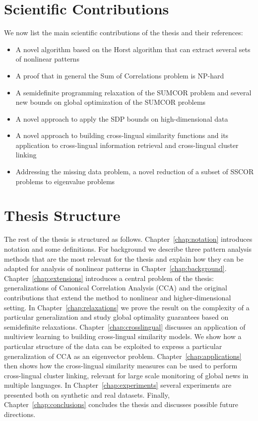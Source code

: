 \section{Scientific Contributions}

We now list the main scientific contributions of the thesis and their references:
\begin{itemize}
\item A novel algorithm based on the Horst algorithm that can extract several sets of nonlinear patterns ~\cite{DBLP:journals/corr/abs-1302-0974}
\item A proof that in general the Sum of Correlations problem is NP-hard ~\cite{DBLP:journals/corr/abs-1302-0974}
\item A semidefinite programming relaxation of the SUMCOR problem and
several new bounds on global optimization of the SUMCOR problems~\cite{DBLP:journals/corr/abs-1302-0974}
\item A novel approach to apply the SDP bounds on high-dimensional data~\cite{DBLP:journals/corr/abs-1302-0974}
\item A novel approach to building cross-lingual similarity functions and its application to cross-lingual information retrieval and cross-lingual cluster linking~\cite{rupnikJAIR}\cite{Belyaeva201564}
\item Addressing the missing data problem, a novel reduction of a subset of SSCOR problems to eigenvalue problems~\cite{rupnikJAIR}
\end{itemize}

\section{Thesis Structure}

The rest of the thesis is structured as follows. Chapter~\ref{chap:notation} introduces notation and some
definitions. For background we describe three pattern analysis methods that are the most relevant
for the thesis and explain how they can be adapted for analysis of nonlinear patterns in Chapter~\ref{chap:background}. Chapter~\ref{chap:extensions}
introduces a central problem of the thesis: generalizations of Canonical Correlation Analysis (CCA) and the original
contributions that extend the method to nonlinear and higher-dimensional setting. In Chapter~\ref{chap:relaxations}
we prove the result on the complexity of a particular generalization and study global optimality guarantees based
on semidefinite relaxations. Chapter~\ref{chap:crosslingual} discusses an application of multiview learning
to building cross-lingual similarity models. We show how a particular structure of the data can be exploited
to express a particular generalization of CCA as an eigenvector problem. Chapter~\ref{chap:applications} then
shows how the cross-lingual similarity measures can be used to perform cross-lingual cluster linking, relevant
for large scale monitoring of global news in multiple languages. In Chapter~\ref{chap:experiments} several experiments
are presented both on synthetic and real datasets. Finally, Chapter~\ref{chap:conclusions} concludes the thesis
and discusses possible future directions. 